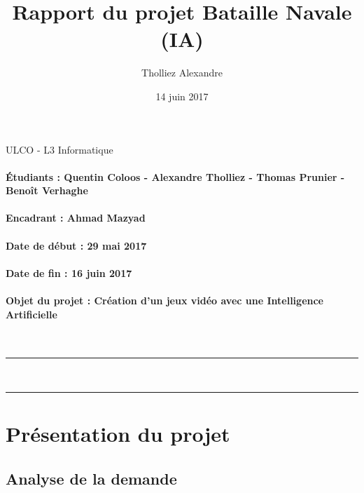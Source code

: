 \documentclass[a4paper,oneside]{article}
\title{Rapport du projet Bataille Navale (IA)}
\author{Tholliez Alexandre}
\date{14 juin 2017}
\begin{document}

\thispagestyle{empty}

\Large
ULCO - L3 Informatique

\vfill 

\Huge
\begin{center}
\@title
\end{center}

\@author

\normalsize

\vfill 

\paragraph{Étudiants : Quentin Coloos - Alexandre Tholliez - Thomas Prunier - Benoît Verhaghe }

\paragraph{Encadrant : Ahmad Mazyad}

\paragraph{Date de début : 29 mai 2017 }

\paragraph{Date de fin : 16 juin 2017 }

\paragraph{Objet du projet : Création d'un jeux vidéo avec une Intelligence Artificielle }

~

\vfill 

\noindent\rule{\linewidth}{0.5pt}

\tableofcontents

~\\
\noindent\rule{\linewidth}{0.5pt}

\clearpage


\section{Présentation du projet}


\subsection{Analyse de la demande}
\end{document}
